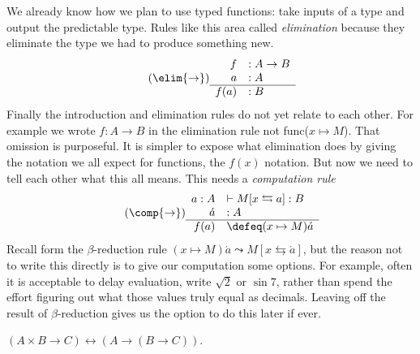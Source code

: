 We already know how we plan to use typed functions:
take inputs of a type and output the predictable type.
Rules like this area called \emph{elimination} because 
they eliminate the type we had to produce something new.
\begin{gather}
    \tag{$\elim{\to}$}
    \begin{array}{rl}
        f&:A\to B\\
        a&:A\\
    \hline
        f(a)&:B
    \end{array}
\end{gather}
Finally the introduction and elimination rules do not yet 
relate to each other.  For example we wrote $f:A\to B$ in the 
elimination rule not func($x\mapsto M$).  That omission is 
purposeful.  It is simpler to expose what elimination does 
by giving the notation we all expect for functions, the $f(x)$
notation.  But now we need to tell each other what this all 
means.  This needs a \emph{computation rule}
\begin{gather}
    \tag{$\comp{\to}$}
    \begin{array}{rl}
        a:A&\vdash M[x\leftrightarrows a]:B\\
        \acute{a}&:A\\
    \hline
        f(a)&\defeq (x\mapsto M)\acute{a}
    \end{array}
\end{gather}
Recall form the $\beta$-reduction rule 
$(x\mapsto M)\acute{a}\leadsto M[x\leftrightarrows \acute{a}]$,
but the reason not to write this directly is to give 
our computation some options.  For example, 
often it is acceptable to delay evaluation, write $\sqrt{2}$
or $\sin 7$, rather than spend the effort figuring out what 
those values truly equal as decimals.  Leaving off the 
result of $\beta$-reduction gives us the option to do this 
later if ever.


\begin{theorem}
    $(A\times B\to C)\longleftrightarrow (A\to (B\to C))$.
\end{theorem}